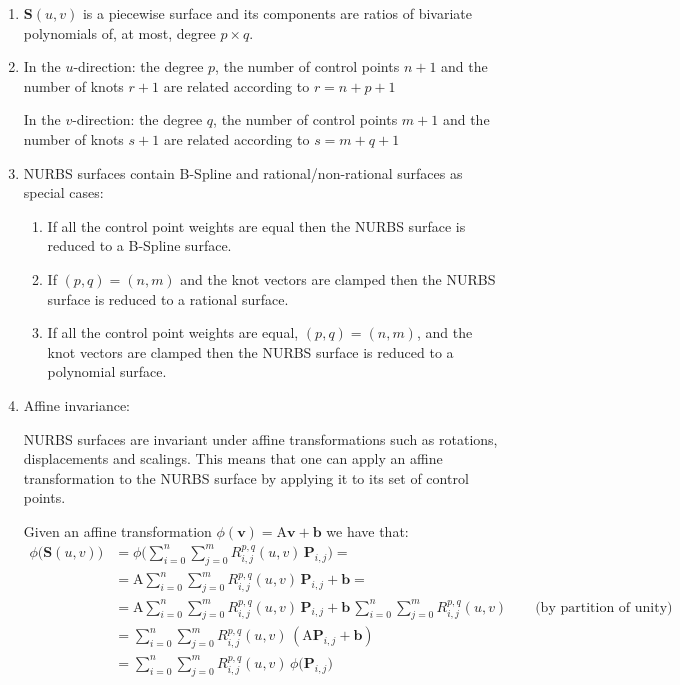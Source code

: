 \begin{enumerate}

    \item $\mathbf{S}(u, v)$ is a piecewise surface and its components are ratios of bivariate polynomials of, at most, degree $p\times q$.
    
    \item In the $u$-direction: the degree $p$, the number of control points $n+1$ and the number of knots $r+1$ are related according to $r = n + p + 1$
    
    In the $v$-direction: the degree $q$, the number of control points $m+1$ and the number of knots $s+1$ are related according to $s = m + q + 1$
    
    \item NURBS surfaces contain B-Spline and rational/non-rational \Bezier surfaces as special cases:
    \begin{enumerate}
        \item If all the control point weights are equal then the NURBS surface is reduced to a B-Spline surface.
        \item If $(p,q) = (n,m)$ and the knot vectors are clamped then the NURBS surface is reduced to a rational \Bezier surface.
        \item If all the control point weights are equal, $(p,q) = (n,m)$, and the knot vectors are clamped then the NURBS surface is reduced to a polynomial \Bezier surface.
    \end{enumerate}
    
    \item Affine invariance:
    
    NURBS surfaces are invariant under affine transformations such as rotations, displacements and scalings. This means that one can apply an affine transformation to the NURBS surface by applying it to its set of control points.
    
    Given an affine transformation $\phi(\mathbf{v}) = \mathrm{A} \mathbf{v} + \mathbf{b}$ we have that:
    \begin{align*}
        \phi \big(\mathbf{S}(u,v)\big) &= \phi \big(\sum_{i=0}^{n}\sum_{j=0}^{m} R_{i,j}^{p, q}(u, v)\, \mathbf{P}_{i,j}\big) = \\
        &= \mathrm{A} \sum_{i=0}^{n}\sum_{j=0}^{m} R_{i,j}^{p, q}(u, v)\, \mathbf{P}_{i,j} + \mathbf{b} = \\
        &= \mathrm{A} \sum_{i=0}^{n}\sum_{j=0}^{m} R_{i,j}^{p, q}(u, v)\, \mathbf{P}_{i,j} + \mathbf{b} \, \sum_{i=0}^{n}\sum_{j=0}^{m} R_{i,j}^{p, q}(u, v) \qquad \text{(by partition of unity)}\\
        &= \sum_{i=0}^{n}\sum_{j=0}^{m} R_{i,j}^{p, q}(u, v)\,(\mathrm{A} \mathbf{P}_{i,j} + \mathbf{b}) \\
        &= \sum_{i=0}^{n}\sum_{j=0}^{m} R_{i,j}^{p, q}(u, v)\,\phi \big(\mathbf{P}_{i,j} \big)
    \end{align*}
    

\end{enumerate}

